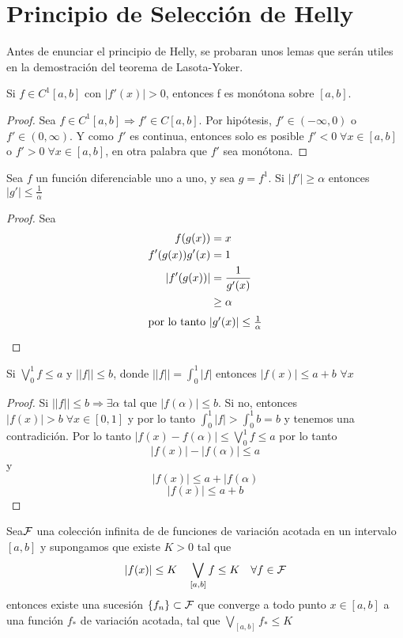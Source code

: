 \section{Principio de Selecci\'on de Helly}

Antes de enunciar el principio de Helly, se probaran unos lemas que ser\'an utiles en la demostraci\'on del teorema de Lasota-Yoker.
\begin{lem} Si $f\in C^1[a,b]$ con $|f'(x)|>0$, entonces f es mon\'otona sobre $[a,b]$.
\end{lem}\label{lema01}

\begin{proof}Sea $f\in C^1[a,b] \Rightarrow f'\in C[a,b]$. Por hip\'otesis, $f'\in(-\infty,0)$ o $f'\in(0, \infty)$.
Y como $f'$ es continua, entonces solo es posible  $f'<0\; \forall x\in[a,b]$ o $f'>0\; \forall x\in[a,b]$, en otra palabra que $f'$ sea mon\'otona.
\end{proof}


\begin{lem}Sea $f$ un funci\'on diferenciable uno a uno, y sea $g=f^1$. Si $|f'|\geq\alpha$ entonces $|g'|\leq\frac{1}{\alpha}$
\end{lem}\label{lema05}

\begin{proof}Sea
\begin{align*}
    f(g(x))&=x\\
    f'(g(x))g'(x)&=1\\
    |f'(g(x))|&=\frac{1}{g'(x)}\\
              &\geq\alpha\\
\intertext{por lo tanto $|g'(x)|\leq\frac{1}{\alpha}$}
\end{align*}
\end{proof}

\begin{lem} Si $\bigvee_0^1{f}\leq a$ y $||f||\leq b$, donde $||f||=\int_0^1{|f|}$ entonces $|f(x)|\leq a+b$ $\forall x$ 
\end{lem}\label{lema07}

\begin{proof} Si $||f||\leq b\Rightarrow\exists\alpha$ tal que $|f(\alpha)|\leq b$. Si no, entonces $|f(x)|>b\;\forall x\in[0,1]$ 
y por lo tanto $\int_0^1{|f|}>\int_0^1{b}=b$ y tenemos una contradici\'on. Por lo tanto $|f(x)-f(\alpha)|\leq \bigvee_0^1{f}\leq a$
por lo tanto
$$|f(x)|-|f(\alpha)|\leq a$$
y $$|f(x)|\leq a+|f(\alpha)$$
$$|f(x)|\leq a+b$$
\end{proof}

\begin{teo}[Helly] Sea$\mathcal{F}$ una colecci\'on infinita de de funciones de variaci\'on acotada en un intervalo $[a,b]$ 
y supongamos que existe $K>0$ tal que 
$$|f(x)|\leq K\quad \bigvee_{[a,b]}{f}\leq K\quad \forall f\in \mathcal{F}$$
entonces existe una sucesi\'on $\{f_n\}\subset\mathcal{F}$ que converge a todo punto $x\in[a,b]$ a una funci\'on $f_*$ de variaci\'on acotada,
 tal que $\bigvee_{[a,b]}{f_*}\leq K$
\end{teo}\label{helly}

